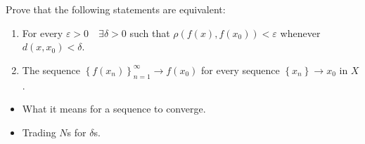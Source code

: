 Prove that the following statements are equivalent:

\begin{enumerate}
\def\labelenumi{\arabic{enumi}.}
\tightlist
\item
  For every \(\varepsilon > 0 \quad \exists \delta > 0\) such that
  \(\rho( f(x), f(x_0) ) < \varepsilon\) whenever
  \(d(x, x_0) < \delta\).
\item
  The sequence \(\left\{{f(x_n)}\right\}_{n=1}^\infty \to f(x_0)\) for
  every sequence \(\left\{{x_n}\right\} \to x_0\) in \(X\).
\end{enumerate}

\begin{concept}

\envlist

\begin{itemize}
\tightlist
\item
  What it means for a sequence to converge.
\item
  Trading \(N\)s for \(\delta\)s.
\end{itemize}

\end{concept}

